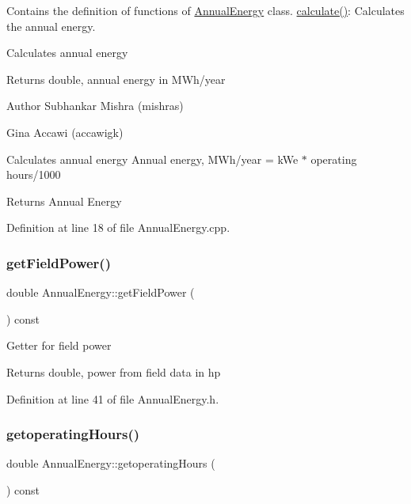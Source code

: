Contains the definition of functions of \hyperlink{class_annual_energy}{Annual\+Energy} class. \hyperlink{class_annual_energy_ab599860ffb32ce20a1042a3e9d2ad57f}{calculate()}\+: Calculates the annual energy. 

Calculates annual energy \begin{DoxyReturn}{Returns}
double, annual energy in M\+Wh/year
\end{DoxyReturn}
\begin{DoxyAuthor}{Author}
Subhankar Mishra (mishras) 

Gina Accawi (accawigk) 
\end{DoxyAuthor}
Calculates annual energy Annual energy, M\+Wh/year = k\+We $\ast$ operating hours/1000 \begin{DoxyReturn}{Returns}
Annual Energy 
\end{DoxyReturn}


Definition at line 18 of file Annual\+Energy.\+cpp.

\mbox{\label{class_annual_energy_a52aa52274243f578ea7f92d27707cacb}} 
\subsubsection{\texorpdfstring{get\+Field\+Power()}{getFieldPower()}}
{\footnotesize\ttfamily double Annual\+Energy\+::get\+Field\+Power (\begin{DoxyParamCaption}{ }\end{DoxyParamCaption}) const\hspace{0.3cm}{\ttfamily [inline]}}

Getter for field power \begin{DoxyReturn}{Returns}
double, power from field data in hp 
\end{DoxyReturn}


Definition at line 41 of file Annual\+Energy.\+h.

\mbox{\label{class_annual_energy_a86a176d57507c7be77d0ead5f794af28}} 
\subsubsection{\texorpdfstring{getoperating\+Hours()}{getoperatingHours()}}
{\footnotesize\ttfamily double Annual\+Energy\+::getoperating\+Hours (\begin{DoxyParamCaption}{ }\end{DoxyParamCaption}) const\hspace{0.3cm}{\ttfamily [inline]}}

